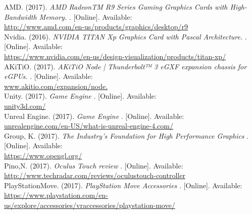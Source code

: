 \documentclass[letterpaper,10pt,onecolumn,compsoc]{IEEEtran}
\begin{document}
\begin{thebibliography}{9}
AMD. (2017). 
\textit{AMD RadeonTM R9 Series Gaming Graphics Cards with High-Bandwidth Memory.} 
. [Online]. Available: 
\\\url{http://www.amd.com/en-us/products/graphics/desktop/r9}
\\
Nvidia. (2016). 
\textit{ NVIDIA TITAN Xp Graphics Card with Pascal Architecture.} 
. [Online]. Available: 
\\\url{https://www.nvidia.com/en-us/design-visualization/products/titan-xp/}
\\
AKiTiO. (2017). 
\textit{AKiTiO Node | Thunderbolt™ 3 eGXF expansion chassis for eGPUs.} 
. [Online]. Available: 
\\\url{www.akitio.com/expansion/node.}
\\
Unity. (2017). 
\textit{Game Engine} 
. [Online]. Available: 
\\\url{ unity3d.com/}
\\
Unreal Engine. (2017). 
\textit{Game Engine} 
. [Online]. Available: 
\\\url{unrealengine.com/en-US/what-is-unreal-engine-4.com/}
\\
Group, K. (2017). 
\textit{The Industry’s Foundation for High Performance Graphics} 
. [Online]. Available: 
\\\url{https://www.opengl.org/}
\\
Pino,N. (2017). 
\textit{Oculus Touch review} 
. [Online]. Available: 
\\\url{http://www.techradar.com/reviews/oculustouch-controller}
\\
PlayStationMove. (2017). 
\textit{PlayStation Move Accessories} 
. [Online]. Available: 
\\\url{https://www.playstation.com/en-us/explore/accessories/vraccessories/playstation-move/}
\\
\iffalse
\bibitem{number}
AUTHOR. (year). 
\textit{title} 
. [Online]. Available: 
\\\url{URL}
\fi

\end{thebibliography}
\end{document}
